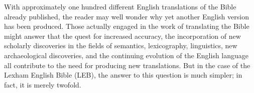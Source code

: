 \onecolumn




\setlength{\fboxsep}{.1625in}
\setlength{\fboxrule}{0.5pt}
\noindent{}


\begingroup
\fontsize{12pt}{11pt}\selectfont

With approximately one hundred different English translations of the Bible already published, the reader may well wonder 
why yet another English version has been produced. Those actually engaged in the work of translating the Bible might 
answer that the quest for increased accuracy, the incorporation of new scholarly discoveries in the fields of semantics, 
lexicography, linguistics, new archaeological discoveries, and the continuing evolution of the English language all 
contribute to the need for producing new translations. But in the case of the Lexham English Bible (LEB), the answer to 
this question is much simpler; in fact, it is merely twofold.\par

